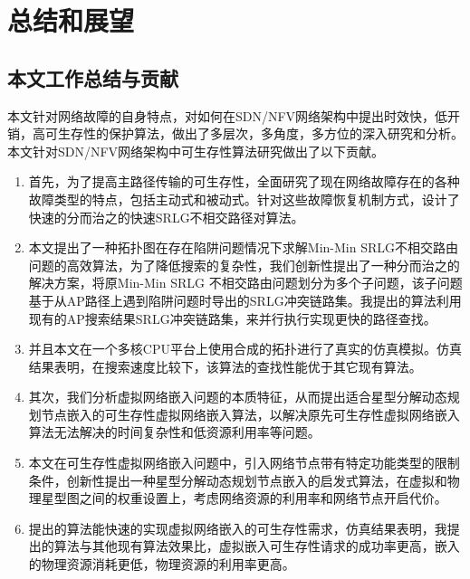 
\chapter{总结和展望}
\section{本文工作总结与贡献}
本文针对网络故障的自身特点，对如何在SDN/NFV网络架构中提出时效快，低开销，高可生存性的保护算法，做出了多层次，多角度，多方位的深入研究和分析。本文针对SDN/NFV网络架构中可生存性算法研究做出了以下贡献。
\begin{enumerate}
  \item 首先，为了提高主路径传输的可生存性，全面研究了现在网络故障存在的各种故障类型的特点，包括主动式和被动式。针对这些故障恢复机制方式，设计了快速的分而治之的快速SRLG不相交路径对算法。
  \item 本文提出了一种拓扑图在存在陷阱问题情况下求解Min-Min SRLG不相交路由问题的高效算法，为了降低搜索的复杂性，我们创新性提出了一种分而治之的解决方案，将原Min-Min SRLG 不相交路由问题划分为多个子问题，该子问题基于从AP路径上遇到陷阱问题时导出的SRLG冲突链路集。我提出的算法利用现有的AP搜索结果SRLG冲突链路集，来并行执行实现更快的路径查找。
  \item 并且本文在一个多核CPU平台上使用合成的拓扑进行了真实的仿真模拟。仿真结果表明，在搜索速度比较下，该算法的查找性能优于其它现有算法。
  \item 其次，我们分析虚拟网络嵌入问题的本质特征，从而提出适合星型分解动态规划节点嵌入的可生存性虚拟网络嵌入算法，以解决原先可生存性虚拟网络嵌入算法无法解决的时间复杂性和低资源利用率等问题。
  \item 本文在可生存性虚拟网络嵌入问题中，引入网络节点带有特定功能类型的限制条件，创新性提出一种星型分解动态规划节点嵌入的启发式算法，在虚拟和物理星型图之间的权重设置上，考虑网络资源的利用率和网络节点开启代价。
  \item   提出的算法能快速的实现虚拟网络嵌入的可生存性需求，仿真结果表明，我提出的算法与其他现有算法效果比，虚拟嵌入可生存性请求的成功率更高，嵌入的物理资源消耗更低，物理资源的利用率更高。
\end{enumerate}



